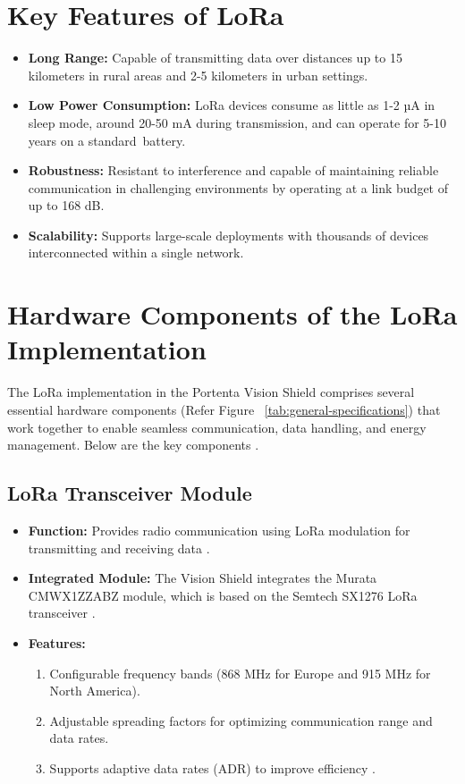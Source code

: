 \section{Key Features of LoRa}

\begin{itemize}
	\item \textbf{Long Range:} Capable of transmitting data over distances up to 15 kilometers in rural areas and 2-5 kilometers in urban settings. 
	\item \textbf{Low Power Consumption:} LoRa devices consume as little as 1-2 µA in sleep mode, around 20-50 mA during transmission, and can operate for 5-10 years on a standard battery. \cite{st_connectivity:2025}
	\item \textbf{Robustness:} Resistant to interference and capable of maintaining reliable communication in challenging environments by operating at a link budget of up to 168 dB. \cite{thethingsnetwork_lorawan:2025}
	\item \textbf{Scalability:} Supports large-scale deployments with thousands of devices interconnected within a single network. \cite{jooby_lora_features:2025}
\end{itemize}

\section{Hardware Components of the LoRa Implementation}

The LoRa implementation in the Portenta Vision Shield comprises several essential hardware components (Refer Figure ~\ref{tab:general-specifications}) that work together to enable seamless communication, data handling, and energy management. Below are the key components \cite{ArduinoLora:2025}.

\subsection{LoRa Transceiver Module}
\begin{itemize}
	\item \textbf{Function:} Provides radio communication using LoRa modulation for transmitting and receiving data \cite{semtech_sx1276:2025}.
	\item \textbf{Integrated Module:} The Vision Shield integrates the Murata CMWX1ZZABZ module, which is based on the Semtech SX1276 LoRa transceiver \cite{murata_transceiver:2025}.
	\item \textbf{Features:} 
	\begin{enumerate}
		\item Configurable frequency bands (868 MHz for Europe and 915 MHz for North America).
		\item Adjustable spreading factors for optimizing communication range and data rates.
		\item Supports adaptive data rates (ADR) to improve efficiency \cite{semtech_sx1276:2025}.
	\end{enumerate}
\end{itemize}

